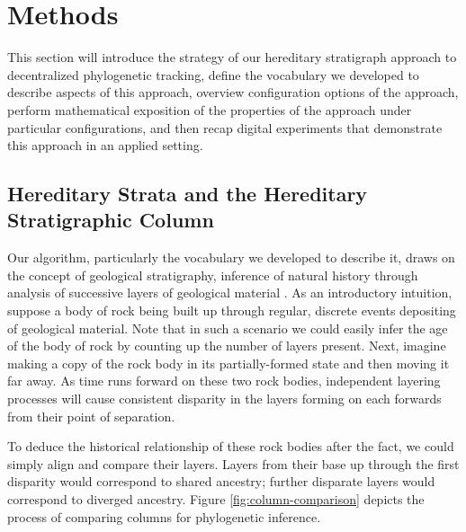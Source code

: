 \section{Methods} \label{sec:methods}

This section will introduce the strategy of our hereditary stratigraph approach to decentralized phylogenetic tracking, define the vocabulary we developed to describe aspects of this approach, overview configuration options of the approach, perform mathematical exposition of the properties of the approach under particular configurations, and then recap digital experiments that demonstrate this approach in an applied setting.

\subsection{Hereditary Strata and the Hereditary Stratigraphic Column}



Our algorithm, particularly the vocabulary we developed to describe it, draws on the concept of geological stratigraphy, inference of natural history through analysis of successive layers of geological material \citep{steno1916prodromus}.
As an introductory intuition, suppose a body of rock being built up through regular, discrete events depositing of geological material.
Note that in such a scenario we could easily infer the age of the body of rock by counting up the number of layers present.
Next, imagine making a copy of the rock body in its partially-formed state and then moving it far away.
As time runs forward on these two rock bodies, independent layering processes will cause consistent disparity in the layers forming on each forwards from their point of separation.

To deduce the historical relationship of these rock bodies after the fact, we could simply align and compare their layers.
Layers from their base up through the first disparity would correspond to shared ancestry; further disparate layers would correspond to diverged ancestry.
Figure \ref{fig:column-comparison} depicts the process of comparing columns for phylogenetic inference.

